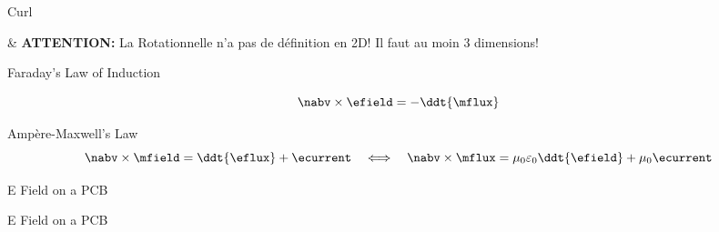 \begin{frame}{Curl}
    \begin{makelist}[\small][1.5]
        \icon[red]{\faExclamationTriangle} & \textbf{ATTENTION:} La Rotationnelle n'a pas de définition en 2D! Il faut au moin 3 dimensions!
    \end{makelist}
\end{frame}

\begin{frame}{Faraday's Law of Induction}
    \begin{twocolumns}[0.35]
    \leftcol
        \vspace{-10pt}
        \begin{equation}
            \nabv \times \efield = -\ddt{\mflux}
        \end{equation}
    \rightcol
 \end{twocolumns}

\end{frame}

\begin{frame}{Ampère-Maxwell's Law}
    \vspace{-10pt}
    \begin{equation}
        \nabv \times \mfield = \ddt{\eflux} + \ecurrent
        \hspace{1em} \Longleftrightarrow \hspace{1.0em}
        \nabv \times \mflux = \mu_0 \varepsilon_0 \ddt{\efield} + \mu_0 \ecurrent
    \end{equation}
\end{frame}

\begin{frame}{E Field on a PCB}
    \vspace{-20pt}
\end{frame}

\begin{frame}{E Field on a PCB}
    \vspace{-20pt}
\end{frame}

